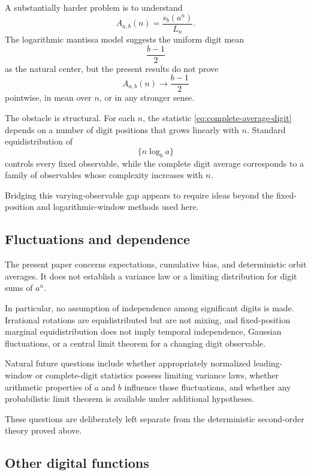 \documentclass[11pt]{article}
\theoremstyle{definition}
\theoremstyle{remark}
\begin{document}
A substantially harder problem is to understand
\begin{equation}
    A_{a,b}(n)
    =
    \frac{s_b(a^n)}{L_n}.
    \label{eq:complete-average-digit}
\end{equation}
The logarithmic mantissa model suggests the uniform digit mean
\[
    \frac{b-1}{2}
\]
as the natural center, but the present results do not prove
\[
    A_{a,b}(n)\to\frac{b-1}{2}
\]
pointwise, in mean over \(n\), or in any stronger sense.

The obstacle is structural.  For each \(n\), the statistic
\eqref{eq:complete-average-digit} depends on a number of digit
positions that grows linearly with \(n\).  Standard equidistribution of
\[
    \{n\log_b a\}
\]
controls every fixed observable, while the complete digit average
corresponds to a family of observables whose complexity increases with
\(n\).

Bridging this varying-observable gap appears to require ideas beyond
the fixed-position and logarithmic-window methods used here.


\subsection{Fluctuations and dependence}
\label{subsec:fluctuations-open}

The present paper concerns expectations, cumulative bias, and
deterministic orbit averages.  It does not establish a variance law or
a limiting distribution for digit sums of \(a^n\).

In particular, no assumption of independence among significant digits
is made.  Irrational rotations are equidistributed but are not mixing,
and fixed-position marginal equidistribution does not imply temporal
independence, Gaussian fluctuations, or a central limit theorem for a
changing digit observable.

Natural future questions include whether appropriately normalized
leading-window or complete-digit statistics possess limiting variance
laws, whether arithmetic properties of \(a\) and \(b\) influence those
fluctuations, and whether any probabilistic limit theorem is available
under additional hypotheses.

These questions are deliberately left separate from the deterministic
second-order theory proved above.


\subsection{Other digital functions}
\label{subsec:other-digital-functions}
\end{document}
